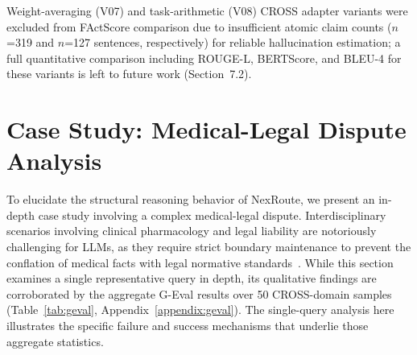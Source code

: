\documentclass[a4paper,fleql]{cas-sc}
\begin{document}
Weight-averaging (V07) and task-arithmetic (V08) CROSS adapter variants were excluded from FActScore comparison due to insufficient atomic claim counts ($n$=319 and $n$=127 sentences, respectively) for reliable hallucination estimation; a full quantitative comparison including ROUGE-L, BERTScore, and BLEU-4 for these variants is left to future work (Section~7.2).

\section{Case Study: Medical-Legal Dispute Analysis}
\label{sec:casestudy}
To elucidate the structural reasoning behavior of NexRoute, we present an
in-depth case study involving a complex medical-legal dispute. Interdisciplinary
scenarios involving clinical pharmacology and legal liability are notoriously
challenging for LLMs, as they require strict boundary maintenance to prevent
the conflation of medical facts with legal normative
standards~\citep{singhal2023large, guha2023legalbench}. While this section
examines a single representative query in depth, its qualitative findings are
corroborated by the aggregate G-Eval results over 50 CROSS-domain samples
(Table~\ref{tab:geval}, Appendix~\ref{appendix:geval}).
The single-query analysis here illustrates the specific failure and success
mechanisms that underlie those aggregate statistics.

\end{document}
